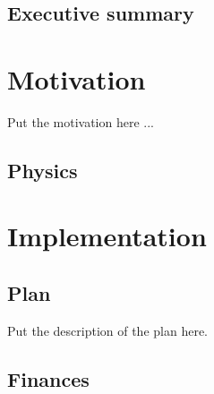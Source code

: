 \documentclass[BOOK, UKenglish, texlive=2016]{\ATLASLATEXPATH atlasdoc}
\begin{document}
\frontmatter
\maketitle

\tableofcontents

\clearpage
\mainmatter
{}
\chapter{Executive summary}

\part{Motivation}

Put the motivation here ...

\chapter{Physics}

\part{Implementation}

\chapter{Plan}

Put the description of the plan here.

\chapter{Finances}
\end{document}
